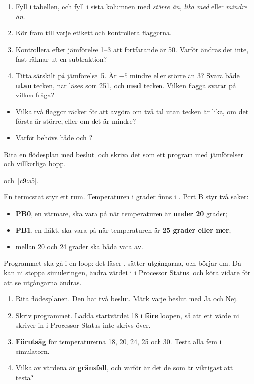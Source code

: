 \begin{enumerate}
  \item Fyll i tabellen, och fyll i sista kolumnen med \emph{större än}, \emph{lika med} eller
    \emph{mindre än}.
  \item Kör fram till varje etikett och kontrollera flaggorna.
  \item Kontrollera efter jämförelse 1--3 att  fortfarande är 50. Varför ändras det inte,
    fast  räknar ut en subtraktion?
  \item Titta särskilt på jämförelse~5. Är $-5$ mindre eller större än 3? Svara både
    \textbf{utan} tecken, när  läses som 251, och \textbf{med} tecken. Vilken flagga
    svarar på vilken fråga?
\end{enumerate}

\begin{itemize}
  \item Vilka två flaggor räcker för att avgöra om två tal utan tecken är lika, om det första är
    större, eller om det är mindre?
  \item Varför behövs både  och ?
\end{itemize}


\label{lab3:d12}
Rita en flödesplan med beslut, och skriva det som ett program med jämförelser och villkorliga hopp.

 och~\ref{c9:a5}.

En termostat styr ett rum. Temperaturen i grader finns i . Port B styr två saker:
\begin{itemize}
  \item \textbf{PB0}, en värmare, ska vara på när temperaturen är \textbf{under 20} grader;
  \item \textbf{PB1}, en fläkt, ska vara på när temperaturen är \textbf{25 grader eller mer};
  \item mellan 20 och 24 grader ska båda vara av.
\end{itemize}

Programmet ska gå i en loop: det läser , sätter utgångarna, och börjar om. Då kan ni
stoppa simuleringen, ändra värdet i  i Processor Status, och köra vidare för att se
utgångarna ändras.

\begin{enumerate}
  \item Rita flödesplanen. Den har två beslut. Märk varje beslut med Ja och Nej.
  \item Skriv programmet. Ladda startvärdet 18 i  \textbf{före} loopen, så att ett värde
    ni skriver in i Processor Status inte skrivs över.
  \item \textbf{Förutsäg}  för temperaturerna 18, 20, 24, 25 och 30. Testa alla fem i
    simulatorn.
  \item Vilka av värdena är \textbf{gränsfall}, och varför är det de som är viktigast att testa?
\end{enumerate}

